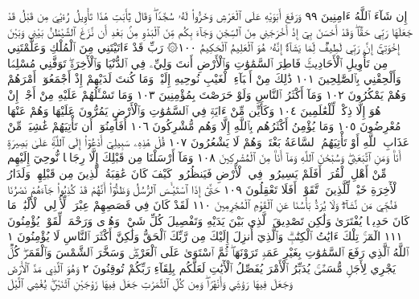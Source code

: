 إِن شَآءَ ٱللَّهُ ءَامِنِينَ ٩٩ وَرَفَعَ أَبَوَيْهِ عَلَى ٱلْعَرْشِ وَخَرُّوا۟
لَهُۥ سُجَّدࣰاۖ وَقَالَ يَٰٓأَبَتِ هَٰذَا تَأْوِيلُ رُءْيَٰيَ مِن قَبْلُ قَدْ جَعَلَهَا
رَبِّي حَقࣰّاۖ وَقَدْ أَحْسَنَ بِيٓ إِذْ أَخْرَجَنِي مِنَ ٱلسِّجْنِ وَجَآءَ بِكُم
مِّنَ ٱلْبَدْوِ مِنۢ بَعْدِ أَن نَّزَغَ ٱلشَّيْطَٰنُ بَيْنِي وَبَيْنَ إِخْوَتِيٓۚ إِنَّ
رَبِّي لَطِيفࣱ لِّمَا يَشَآءُۚ إِنَّهُۥ هُوَ ٱلْعَلِيمُ ٱلْحَكِيمُ ١٠٠۞ رَبِّ
قَدْ ءَاتَيْتَنِي مِنَ ٱلْمُلْكِ وَعَلَّمْتَنِي مِن تَأْوِيلِ ٱلْأَحَادِيثِۚ
فَاطِرَ ٱلسَّمَٰوَٰتِ وَٱلْأَرْضِ أَنتَ وَلِيِّۦ فِي ٱلدُّنْيَا وَٱلْأٓخِرَةِۖ
تَوَفَّنِي مُسْلِمࣰا وَأَلْحِقْنِي بِٱلصَّٰلِحِينَ ١٠١ ذَٰلِكَ مِنْ أَنۢبَآءِ
ٱلْغَيْبِ نُوحِيهِ إِلَيْكَۖ وَمَا كُنتَ لَدَيْهِمْ إِذْ أَجْمَعُوٓا۟ أَمْرَهُمْ
وَهُمْ يَمْكُرُونَ ١٠٢ وَمَآ أَكْثَرُ ٱلنَّاسِ وَلَوْ حَرَصْتَ بِمُؤْمِنِينَ ١٠٣
وَمَا تَسْـَٔلُهُمْ عَلَيْهِ مِنْ أَجْرٍۚ إِنْ هُوَ إِلَّا ذِكْرࣱ لِّلْعَٰلَمِينَ ١٠٤
وَكَأَيِّن مِّنْ ءَايَةࣲ فِي ٱلسَّمَٰوَٰتِ وَٱلْأَرْضِ يَمُرُّونَ عَلَيْهَا
وَهُمْ عَنْهَا مُعْرِضُونَ ١٠٥ وَمَا يُؤْمِنُ أَكْثَرُهُم بِٱللَّهِ إِلَّا
وَهُم مُّشْرِكُونَ ١٠٦ أَفَأَمِنُوٓا۟ أَن تَأْتِيَهُمْ غَٰشِيَةࣱ مِّنْ عَذَابِ
ٱللَّهِ أَوْ تَأْتِيَهُمُ ٱلسَّاعَةُ بَغْتَةࣰ وَهُمْ لَا يَشْعُرُونَ ١٠٧ قُلْ
هَٰذِهِۦ سَبِيلِيٓ أَدْعُوٓا۟ إِلَى ٱللَّهِۚ عَلَىٰ بَصِيرَةٍ أَنَا۠ وَمَنِ ٱتَّبَعَنِيۖ
وَسُبْحَٰنَ ٱللَّهِ وَمَآ أَنَا۠ مِنَ ٱلْمُشْرِكِينَ ١٠٨ وَمَآ أَرْسَلْنَا مِن
قَبْلِكَ إِلَّا رِجَالࣰا نُّوحِيٓ إِلَيْهِم مِّنْ أَهْلِ ٱلْقُرَىٰٓۗ أَفَلَمْ يَسِيرُوا۟
فِي ٱلْأَرْضِ فَيَنظُرُوا۟ كَيْفَ كَانَ عَٰقِبَةُ ٱلَّذِينَ مِن
قَبْلِهِمْۗ وَلَدَارُ ٱلْأٓخِرَةِ خَيْرࣱ لِّلَّذِينَ ٱتَّقَوْا۟ۚ أَفَلَا تَعْقِلُونَ ١٠٩
حَتَّىٰٓ إِذَا ٱسْتَيْـَٔسَ ٱلرُّسُلُ وَظَنُّوٓا۟ أَنَّهُمْ قَدْ كُذِبُوا۟
جَآءَهُمْ نَصْرُنَا فَنُجِّيَ مَن نَّشَآءُۖ وَلَا يُرَدُّ بَأْسُنَا عَنِ ٱلْقَوْمِ
ٱلْمُجْرِمِينَ ١١٠ لَقَدْ كَانَ فِي قَصَصِهِمْ عِبْرَةࣱ لِّأُو۟لِي ٱلْأَلْبَٰبِۗ
مَا كَانَ حَدِيثࣰا يُفْتَرَىٰ وَلَٰكِن تَصْدِيقَ ٱلَّذِي بَيْنَ يَدَيْهِ
وَتَفْصِيلَ كُلِّ شَيْءࣲ وَهُدࣰى وَرَحْمَةࣰ لِّقَوْمࣲ يُؤْمِنُونَ ١١١
الٓمٓرۚ تِلْكَ ءَايَٰتُ ٱلْكِتَٰبِۗ وَٱلَّذِيٓ أُنزِلَ إِلَيْكَ مِن رَّبِّكَ ٱلْحَقُّ
وَلَٰكِنَّ أَكْثَرَ ٱلنَّاسِ لَا يُؤْمِنُونَ ١ ٱللَّهُ ٱلَّذِي رَفَعَ ٱلسَّمَٰوَٰتِ
بِغَيْرِ عَمَدࣲ تَرَوْنَهَاۖ ثُمَّ ٱسْتَوَىٰ عَلَى ٱلْعَرْشِۖ وَسَخَّرَ ٱلشَّمْسَ وَٱلْقَمَرَۖ
كُلࣱّ يَجْرِي لِأَجَلࣲ مُّسَمࣰّىۚ يُدَبِّرُ ٱلْأَمْرَ يُفَصِّلُ ٱلْأٓيَٰتِ لَعَلَّكُم
بِلِقَآءِ رَبِّكُمْ تُوقِنُونَ ٢ وَهُوَ ٱلَّذِي مَدَّ ٱلْأَرْضَ وَجَعَلَ فِيهَا رَوَٰسِيَ
وَأَنْهَٰرࣰاۖ وَمِن كُلِّ ٱلثَّمَرَٰتِ جَعَلَ فِيهَا زَوْجَيْنِ ٱثْنَيْنِۖ يُغْشِي ٱلَّيْلَ
